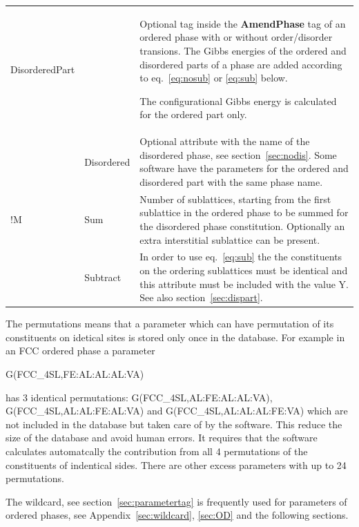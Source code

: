 \documentclass{article}
\begin{document}
\begin{tabular}{|p{} p{} p{}|}
  DisorderedPart & & Optional tag inside the {\bf AmendPhase} tag of an 
              ordered phase with or without order/disorder transions.
              The Gibbs energies of the ordered and disordered parts
              of a phase are added according to eq.~\ref{eq:nosub} or
              \ref{eq:sub} below.

              The configurational Gibbs energy is calculated for
              the ordered part only.  \\

   & Disordered & Optional attribute with the name of the disordered phase, 
            see section~\ref{sec:nodis}.  Some software have the parameters
            for the ordered and disordered part with the same phase name.\\

!M  & Sum &  Number of sublattices, starting from the first sublattice in the
             ordered phase to be summed for the disordered phase
             constitution.  Optionally an extra interstitial
             sublattice can be present.\\

   & Subtract & In order to use eq.~\ref{eq:sub} the the constituents on
              the ordering sublattices must be identical and this
              attribute must be included with the value Y.  See also
              section~\ref{sec:dispart}. \\\hline

\end{tabular}

The permutations means that a parameter which can have permutation of
its constituents on idetical sites is stored only once in the
database.  For example in an FCC ordered phase a parameter

G(FCC\_4SL,FE:AL:AL:AL:VA)

\noindent
has 3 identical permutations: G(FCC\_4SL,AL:FE:AL:AL:VA),
G(FCC\_4SL,AL:AL:FE:AL:VA) and G(FCC\_4SL,AL:AL:AL:FE:VA) which are
not included in the database but taken care of by the software.  This
reduce the size of the database and avoid human errors.  It requires
that the software calculates automatcally the contribution from all 4
permutations of the constituents of indentical sides.  There are other
excess parameters with up to 24 permutations.

The wildcard, see section~\ref{sec:parametertag} is frequently used
for parameters of ordered phases, see Appendix~\ref{sec:wildcard},
\ref{sec:OD} and the following sections.
\end{document}
